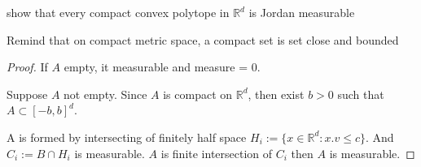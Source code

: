 \begin{exercise}
show that every compact convex polytope in \(\mathbb R^d\) is Jordan measurable
\end{exercise}
Remind that on compact metric space, a compact set is set close and bounded

\begin{proof}
If \(A\) empty, it measurable and measure = 0.

Suppose \(A\) not empty.
Since \(A\) is compact on \(\mathbb R^d\), then exist \(b > 0\) such that 
\(A \subset [-b, b]^d\). 

A is formed by intersecting of finitely half space \(H_i := \{x \in \mathbb R^d: x.v \leq c\}\). And \(C_i := B \cap H_i\) is measurable.
\(A\) is finite intersection of \(C_i\) then \(A\) is measurable.
\end{proof}